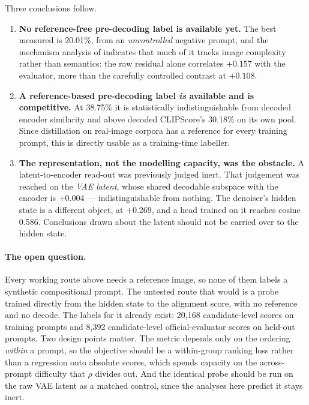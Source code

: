 \documentclass[10pt]{article}
\newcommand{\obs}[1]{\textcolor{observedblue}{#1}}
\begin{document}
Three conclusions follow.

\begin{enumerate}
  \item \textbf{No reference-free pre-decoding label is available yet.} The best measured is
    \obs{20.01\%}, from an \emph{uncontrolled} negative prompt, and the mechanism analysis of
     indicates that much of it tracks image complexity rather than semantics: the raw
    residual alone correlates \obs{$+0.157$} with the evaluator, more than the carefully controlled
    contrast at \obs{$+0.108$}.
  \item \textbf{A reference-based pre-decoding label \emph{is} available and is competitive.} At
    \obs{38.75\%} it is statistically indistinguishable from decoded encoder similarity and above
    decoded CLIPScore's \obs{30.18\%} on its own pool. Since distillation on real-image corpora has a
    reference for every training prompt, this is directly usable as a training-time labeller.
  \item \textbf{The representation, not the modelling capacity, was the obstacle.} A latent-to-encoder
    read-out was previously judged inert. That judgement was reached on the \emph{VAE latent}, whose
    shared decodable subspace with the encoder is \obs{+0.004} --- indistinguishable from nothing. The
    denoiser's hidden state is a different object, at \obs{+0.269}, and a head trained on it reaches
    cosine \obs{0.586}. Conclusions drawn about the latent should not be carried over to the hidden
    state.
\end{enumerate}

\paragraph{The open question.} Every working route above needs a reference image, so none of them
labels a synthetic compositional prompt. The untested route that would is a probe trained directly
from the hidden state to the alignment score, with no reference and no decode. The labels for it
already exist: \obs{20{,}168} candidate-level scores on training prompts and \obs{8{,}392}
candidate-level official-evaluator scores on held-out prompts. Two design points matter. The metric
depends only on the ordering \emph{within} a prompt, so the objective should be a within-group
ranking loss rather than a regression onto absolute scores, which spends capacity on the
across-prompt difficulty that $\rho$ divides out. And the identical probe should be run on the raw
VAE latent as a matched control, since the analyses here predict it stays inert.
\end{document}
